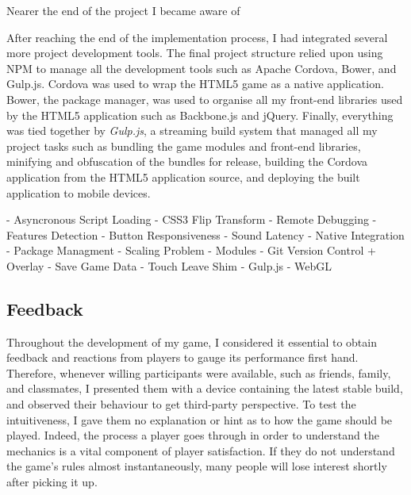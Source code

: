 \documentclass[final]{cmpreport}
\begin{document}
Nearer the end of the project I became aware of 

After reaching the end of the implementation process, I had integrated several more project development tools. The final project structure relied upon using NPM to manage all the development tools such as Apache Cordova, Bower, and Gulp.js. Cordova was used to wrap the HTML5 game as a native application. Bower, the package manager, was used to organise all my front-end libraries used by the HTML5 application such as Backbone.js and jQuery. Finally, everything was tied together by \textit{Gulp.js}, a streaming build system that managed all my project tasks such as bundling the game modules and front-end libraries, minifying and obfuscation of the bundles for release, building the Cordova application from the HTML5 application source, and deploying the built application to mobile devices.

- Asyncronous Script Loading
- CSS3 Flip Transform
- Remote Debugging
- Features Detection
- Button Responsiveness
- Sound Latency
- Native Integration
- Package Managment
- Scaling Problem
- Modules
- Git Version Control + Overlay
- Save Game Data
- Touch Leave Shim
- Gulp.js
- WebGL


\subsection{Feedback}
Throughout the development of my game, I considered it essential to obtain feedback and reactions from players to gauge its performance first hand. Therefore, whenever willing participants were available, such as friends, family, and classmates, I presented them with a device containing the latest stable build, and observed their behaviour to get third-party perspective. To test the intuitiveness, I gave them no explanation or hint as to how the game should be played. Indeed, the process a player goes through in order to understand the mechanics is a vital component of player satisfaction. If they do not understand the game's rules almost instantaneously, many people will lose interest shortly after picking it up.
\end{document}
